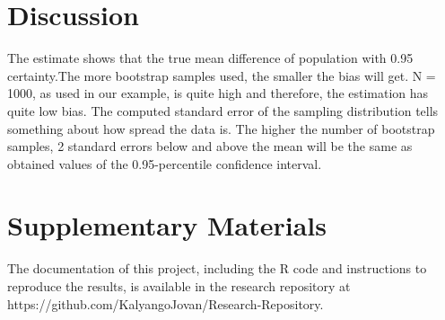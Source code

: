 \documentclass{article}
\begin{document}
\section{Discussion}
The estimate shows that the true mean difference of population with 0.95 certainty.The more bootstrap samples used, the smaller the bias will get. N = 1000, as used in our example, is quite high and therefore, the estimation has quite low bias. The computed standard error of the sampling distribution tells something about how spread the data is. The higher the number of bootstrap samples, 2 standard errors below and above the mean will be the same as obtained values of the 0.95-percentile confidence interval. 



\section*{Supplementary Materials}
The documentation of this project, including the R code and instructions to reproduce the results,
is available in the research repository at https://github.com/KalyangoJovan/Research-Repository.


\printbibliography
\end{document}
